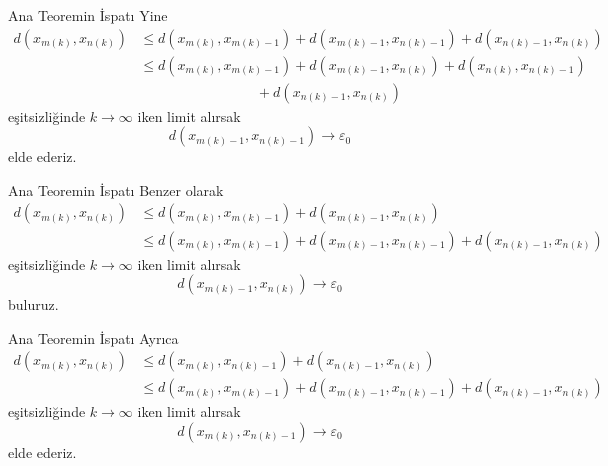 \documentclass[8pt]{beamer}
\begin{document}
\begin{frame}
 \begin{block}{Ana Teoremin \.{I}spat\i }
Yine
    \begin{align}
      d(x_{m(k)},x_{n(k)})&\leq  d(x_{m(k)},x_{m(k)-1})+d(x_{m(k)-1},x_{n(k)-1})+d(x_{n(k)-1},x_{n(k)})\\ 
      &\leq d(x_{m(k)},x_{m(k)-1})+d(x_{m(k)-1},x_{n(k)})+d(x_{n(k)},x_{n(k)-1})\\
      &\hspace{100pt} +d(x_{n(k)-1},x_{n(k)})
    \end{align}
e\c{s}itsizli\u{g}inde $k\to \infty$ iken limit al\i rsak 
     \begin{equation}
        d(x_{m(k)-1},x_{n(k)-1})\to \varepsilon_0
     \end{equation}
elde ederiz.

\end{block}
\end{frame}%


\begin{frame}
 \begin{block}{Ana Teoremin \.{I}spat\i }
Benzer olarak
    \begin{align}
      d(x_{m(k)},x_{n(k)})&\leq  d(x_{m(k)},x_{m(k)-1})+d(x_{m(k)-1},x_{n(k)})\\ 
      &\leq d(x_{m(k)},x_{m(k)-1})+d(x_{m(k)-1},x_{n(k)-1})+d(x_{n(k)-1},x_{n(k)})
    \end{align}
e\c{s}itsizli\u{g}inde $k\to \infty$ iken limit al\i rsak 
     \begin{equation}
        d(x_{m(k)-1},x_{n(k)})\to \varepsilon_0
     \end{equation}
buluruz.
\end{block}
\end{frame}%


\begin{frame}
 \begin{block}{Ana Teoremin \.{I}spat\i }
Ayr\i ca
    \begin{align}
      d(x_{m(k)},x_{n(k)})&\leq  d(x_{m(k)},x_{n(k)-1})+d(x_{n(k)-1},x_{n(k)})\\ 
      &\leq d(x_{m(k)},x_{m(k)-1})+d(x_{m(k)-1},x_{n(k)-1})+d(x_{n(k)-1},x_{n(k)})
    \end{align}
e\c{s}itsizli\u{g}inde $k\to \infty$ iken limit al\i rsak 
     \begin{equation}
        d(x_{m(k)},x_{n(k)-1})\to \varepsilon_0
     \end{equation}
elde ederiz.

\end{block}
\end{frame}%
\end{document}
